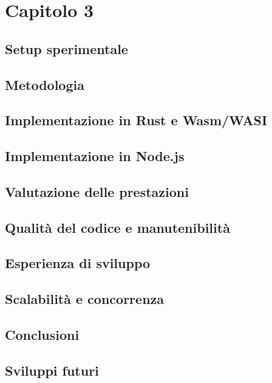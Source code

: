 \chapter{Capitolo 3}
\label{chap:3}
\section{Setup sperimentale}
\section{Metodologia}
\section{Implementazione in Rust e Wasm/WASI}
\section{Implementazione in Node.js}
\section{Valutazione delle prestazioni}
\section{Qualità del codice e manutenibilità}
\section{Esperienza di sviluppo}
\section{Scalabilità e concorrenza}
\section{Conclusioni}
\section{Sviluppi futuri}